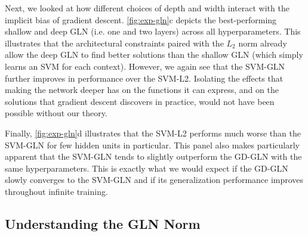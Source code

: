 \documentclass{article}
\theoremstyle{plain}
\theoremstyle{definition}
\theoremstyle{remark}
\begin{document}
Next, we looked at how different choices of depth and width interact with the implicit bias of gradient descent.
\cref{fig:exp-gln}c depicts the best-performing shallow and deep GLN (i.e. one and two layers) across all hyperparameters.
This illustrates that the architectural constraints paired with the $L_2$ norm already allow the deep GLN to find better solutions than the shallow GLN (which simply learns an SVM for each context).
However, we again see that the SVM-GLN further improves in performance over the SVM-L2.
Isolating the effects that making the network deeper has on the functions it can express, and on the solutions that gradient descent discovers in practice, would not have been possible without our theory.

Finally, \cref{fig:exp-gln}d illustrates that the SVM-L2 performs much worse than the SVM-GLN for few hidden units in particular.
This panel also makes particularly apparent that the SVM-GLN tends to slightly outperform the GD-GLN with the same hyperparameters.
This is exactly what we would expect if the GD-GLN slowly converges to the SVM-GLN and if its generalization performance improves throughout infinite training.

\subsection{Understanding the GLN Norm}
\label{sec:gln-norm}
\end{document}
